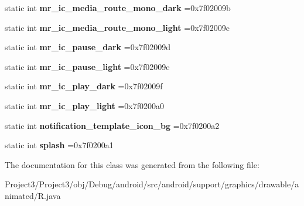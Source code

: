 \begin{DoxyCompactItemize}
\mbox{\label{classandroid_1_1support_1_1graphics_1_1drawable_1_1animated_1_1R_1_1drawable_adc7cfa414d03450b713697fd6a49faac}} 
static int {\bfseries mr\+\_\+ic\+\_\+media\+\_\+route\+\_\+mono\+\_\+dark} =0x7f02009b
\item 
\mbox{\label{classandroid_1_1support_1_1graphics_1_1drawable_1_1animated_1_1R_1_1drawable_aeec4c745ad6533e4c2a7fabf2ca9a0f5}} 
static int {\bfseries mr\+\_\+ic\+\_\+media\+\_\+route\+\_\+mono\+\_\+light} =0x7f02009c
\item 
\mbox{\label{classandroid_1_1support_1_1graphics_1_1drawable_1_1animated_1_1R_1_1drawable_a67b7e557540fb5dce379688b2afb241a}} 
static int {\bfseries mr\+\_\+ic\+\_\+pause\+\_\+dark} =0x7f02009d
\item 
\mbox{\label{classandroid_1_1support_1_1graphics_1_1drawable_1_1animated_1_1R_1_1drawable_aeee24dfcc3aac21db193d042f1f52726}} 
static int {\bfseries mr\+\_\+ic\+\_\+pause\+\_\+light} =0x7f02009e
\item 
\mbox{\label{classandroid_1_1support_1_1graphics_1_1drawable_1_1animated_1_1R_1_1drawable_acb7e6dc324b8ed0ad7b712bb19eed058}} 
static int {\bfseries mr\+\_\+ic\+\_\+play\+\_\+dark} =0x7f02009f
\item 
\mbox{\label{classandroid_1_1support_1_1graphics_1_1drawable_1_1animated_1_1R_1_1drawable_aba37cd71bfbdb1a47812616b5749546e}} 
static int {\bfseries mr\+\_\+ic\+\_\+play\+\_\+light} =0x7f0200a0
\item 
\mbox{\label{classandroid_1_1support_1_1graphics_1_1drawable_1_1animated_1_1R_1_1drawable_a0f2db5173246e382603341c903ba5ed2}} 
static int {\bfseries notification\+\_\+template\+\_\+icon\+\_\+bg} =0x7f0200a2
\item 
\mbox{\label{classandroid_1_1support_1_1graphics_1_1drawable_1_1animated_1_1R_1_1drawable_a287e74c2a5c9967714b9e109e7dc880c}} 
static int {\bfseries splash} =0x7f0200a1
\end{DoxyCompactItemize}


The documentation for this class was generated from the following file\+:\begin{DoxyCompactItemize}
\item 
Project3/\+Project3/obj/\+Debug/android/src/android/support/graphics/drawable/animated/R.\+java\end{DoxyCompactItemize}
